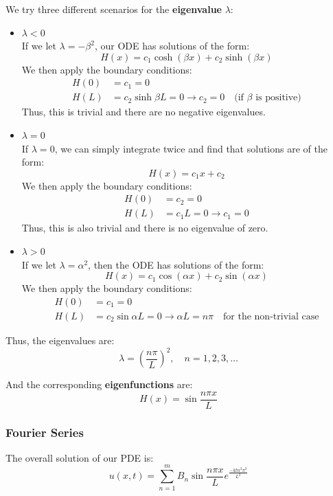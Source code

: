 \documentclass{article}
\begin{document}
We try three different scenarios for the \textbf{eigenvalue} \(\lambda \):
\begin{itemize}
    \item \(\lambda <0\) \\
     If we let \(\lambda =-\beta^2\), our ODE has solutions of the form:
     \[
        H(x)=c_1\cosh (\beta x)+c_2 \sinh (\beta x)
     \]
     We then apply the boundary conditions:
     \begin{align*}
        H(0)&=c_1=0\\
        H(L)&=c_2 \sinh{\beta L}=0 \rightarrow c_2=0 \quad \text{(if }\beta\text{ is positive)}
     \end{align*}
     Thus, this is trivial and there are no negative eigenvalues.
    \item \(\lambda =0\) \\
    If \(\lambda=0\), we can simply integrate twice and find that solutions are of the form:
    \[
        H(x)=c_1x+c_2
    \]
    We then apply the boundary conditions:
    \begin{align*}
        H(0)&=c_2=0 \\
        H(L)&=c_1L=0 \rightarrow c_1=0
    \end{align*}
    Thus, this is also trivial and there is no eigenvalue of zero.
    \item \(\lambda >0\) \\
    If we let \(\lambda = \alpha ^2\), then the ODE has solutions of the form:
    \[
        H(x)=c_1\cos (\alpha x)+c_2 \sin(\alpha x)
    \]
    We then apply the boundary conditions:
    \begin{align*}
        H(0)&=c_1=0  \\
        H(L)&=c_2\sin{\alpha L}=0 \rightarrow \alpha L=n \pi \quad \text{for the non-trivial case}
    \end{align*}
\end{itemize}

Thus, the eigenvalues are:
\[
    \lambda =(\frac{n \pi }{L})^2, \quad n=1,2,3, \dots
\] 

And the corresponding \textbf{eigenfunctions} are:
\[
    H(x)=\sin \frac{n \pi x}{L}
\]

\subsubsection{Fourier Series}

The overall solution of our PDE is:
\[
    u(x,t)=\sum_{n=1}^{m} B_n \sin{\frac{n \pi x}{L}}e^\frac{-ktn^2\pi ^2}{L^2}
\]
\end{document}
